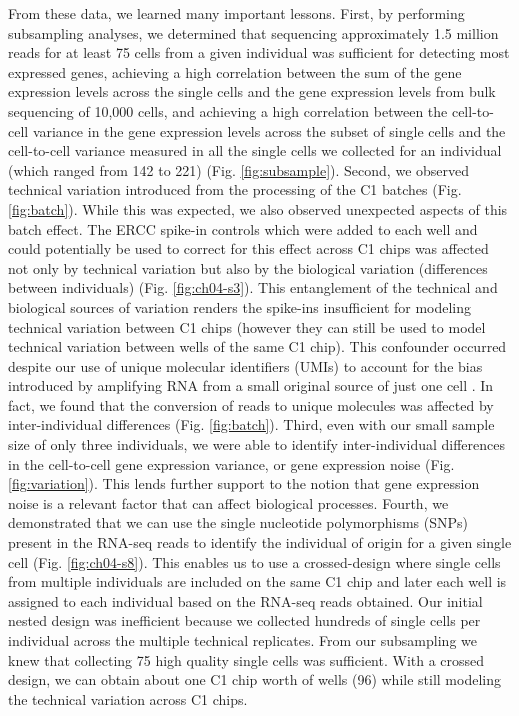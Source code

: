 From these data, we learned many important lessons. First, by
performing subsampling analyses, we determined that sequencing
approximately 1.5 million reads for at least 75 cells from a given
individual was sufficient for detecting most expressed genes,
achieving a high correlation between the sum of the gene expression
levels across the single cells and the gene expression levels from
bulk sequencing of 10,000 cells, and achieving a high correlation
between the cell-to-cell variance in the gene expression levels across
the subset of single cells and the cell-to-cell variance measured in
all the single cells we collected for an individual (which ranged from
142 to 221) (Fig. \ref{fig:subsample}). Second, we observed technical variation introduced from
the processing of the C1 batches (Fig. \ref{fig:batch}). While this was expected, we also
observed unexpected aspects of this batch effect. The ERCC spike-in
controls which were added to each well and could potentially be used
to correct for this effect across C1 chips was affected not only by
technical variation but also by the biological variation (differences
between individuals) (Fig. \ref{fig:ch04-s3}). This entanglement of the technical and
biological sources of variation renders the spike-ins insufficient for
modeling technical variation between C1 chips (however they can still
be used to model technical variation between wells of the same C1
chip). This confounder occurred despite our use of unique molecular
identifiers (UMIs) to account for the bias introduced by amplifying
RNA from a small original source of just one cell \citep{Kivioja2011, Islam2014}. In fact, we found
that the conversion of reads to unique molecules was affected by
inter-individual differences (Fig. \ref{fig:batch}). Third, even with our small sample size
of only three individuals, we were able to identify inter-individual
differences in the cell-to-cell gene expression variance, or gene
expression noise (Fig. \ref{fig:variation}). This lends further support to the notion that gene
expression noise is a relevant factor that can affect biological
processes. Fourth, we demonstrated that we can use the single
nucleotide polymorphisms (SNPs) present in the RNA-seq reads to
identify the individual of origin for a given single cell \citep{Jun2012} (Fig. \ref{fig:ch04-s8}). This
enables us to use a crossed-design where single cells from multiple
individuals are included on the same C1 chip and later each well is
assigned to each individual based on the RNA-seq reads obtained. Our
initial nested design was inefficient because we collected hundreds of
single cells per individual across the multiple technical
replicates. From our subsampling we knew that collecting 75 high
quality single cells was sufficient. With a crossed design, we can
obtain about one C1 chip worth of wells (96) while still modeling the
technical variation across C1 chips.


